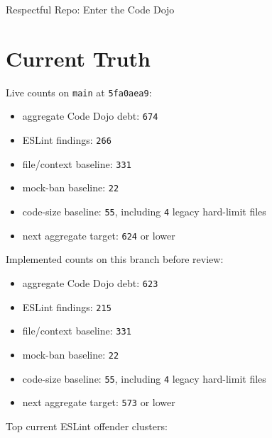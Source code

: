 \begin{CodeBlock}
Respectful Repo: Enter the Code Dojo
\end{CodeBlock}

\section{Current Truth}\label{record-237-current-truth}

Live counts on \texttt{m\allowbreak{}a\allowbreak{}i\allowbreak{}n} at \texttt{5\allowbreak{}f\allowbreak{}a\allowbreak{}0\allowbreak{}a\allowbreak{}e\allowbreak{}a\allowbreak{}9}:

\begin{itemize}
\tightlist
\item
  aggregate Code Dojo debt: \texttt{6\allowbreak{}7\allowbreak{}4}
\item
  ESLint findings: \texttt{2\allowbreak{}6\allowbreak{}6}
\item
  file/context baseline: \texttt{3\allowbreak{}3\allowbreak{}1}
\item
  mock-ban baseline: \texttt{2\allowbreak{}2}
\item
  code-size baseline: \texttt{5\allowbreak{}5}, including \texttt{4} legacy hard-limit files
\item
  next aggregate target: \texttt{6\allowbreak{}2\allowbreak{}4} or lower
\end{itemize}

Implemented counts on this branch before review:

\begin{itemize}
\tightlist
\item
  aggregate Code Dojo debt: \texttt{6\allowbreak{}2\allowbreak{}3}
\item
  ESLint findings: \texttt{2\allowbreak{}1\allowbreak{}5}
\item
  file/context baseline: \texttt{3\allowbreak{}3\allowbreak{}1}
\item
  mock-ban baseline: \texttt{2\allowbreak{}2}
\item
  code-size baseline: \texttt{5\allowbreak{}5}, including \texttt{4} legacy hard-limit files
\item
  next aggregate target: \texttt{5\allowbreak{}7\allowbreak{}3} or lower
\end{itemize}

Top current ESLint offender clusters:

